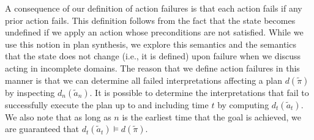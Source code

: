 \documentclass{article}
\begin{document}
A consequence of our definition of action failures is that each action fails if any prior action fails.  This definition follows from the fact that the state becomes undefined if we apply an action whose preconditions are not satisfied.  While we use this notion in plan synthesis, we explore this semantics and the semantics that the state does not change (i.e., it is defined) upon failure when we discuss acting in incomplete domains.  The reason that we define action failures in this manner is that we can determine all failed interpretations affecting a plan $d(\tilde{\pi})$  by inspecting $d_n(\tilde{a}_n)$.
%
It is possible to determine the interpretations that fail to successfully execute the plan up to and including time $t$ by computing $d_t(\tilde{a}_t)$.  We also note that as long as $n$ is the earliest time that the goal is achieved, we are guaranteed that $d_{t}(\tilde{a}_{t}) \models d(\tilde{\pi})$.  
\end{document}
